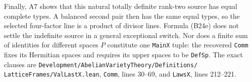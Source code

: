 Finally, A7 shows that this natural
totally definite rank-two source has
equal complete types.  A balanced second
pair then has the same equal types, so
the selected four-factor line is a
product of divisor lines.  Formula
(B24e) does not settle the indefinite
source in a general exceptional switch.
Nor does a finite sum of identities
for different spaces $P$ constitute
one \texttt{MainX} tuple: the recovered
\texttt{Comm} fixes its Hermitian spaces
and requires its upper spaces to be
\texttt{DefSp}.  The exact clauses are
\texttt{Development/AbelianVarietyTheory/Definitions/}
\texttt{LatticeFrames/ValLastX.lean},
\texttt{Comm}, lines 30--69, and
\texttt{LawsX}, lines 212--221.
